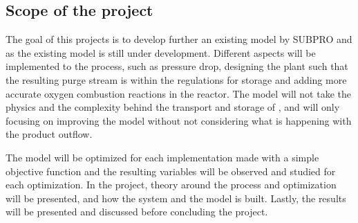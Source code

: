 \subsection{Scope of the project}
The goal of this projects is to develop further an existing model by SUBPRO and as the existing model is still under development. Different aspects will be implemented to the process, such as pressure drop, designing the plant such that the resulting  purge stream is within the regulations for  storage and adding more accurate oxygen combustion reactions in the reactor. The model will not take the physics and the complexity behind the transport and storage of , and will only focusing on improving the model without not considering what is happening with the product outflow.

The model will be optimized for each implementation made with a simple objective function and the resulting variables will be observed and studied for each optimization. In the project, theory around the process and optimization will be presented, and how the system and the model is built. Lastly, the results will be presented and discussed before concluding the project. 